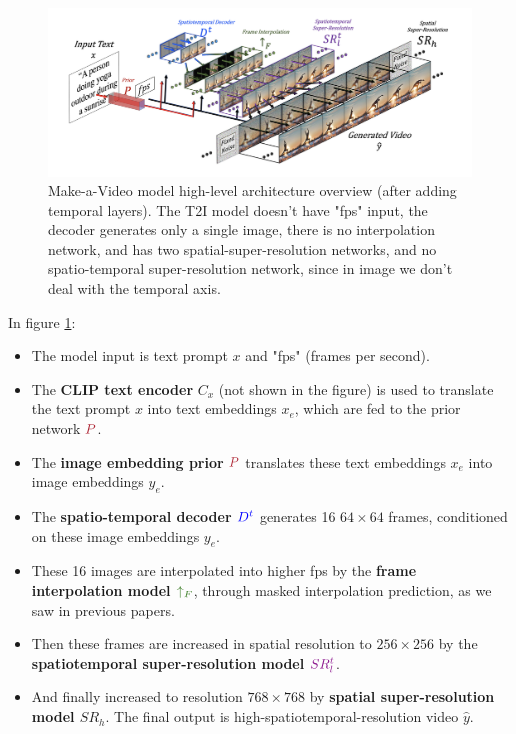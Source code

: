 \begin{figure}
    \centering
    \includegraphics[width=1\textwidth]{images/make_a_video/overview.png}
    \caption{Make-a-Video model high-level architecture overview (after adding temporal layers). The T2I model doesn't have "fps" input, the decoder generates only a single image, there is no interpolation network, and has two spatial-super-resolution networks, and no spatio-temporal super-resolution network, since in image we don't deal with the temporal axis.}
    \label{fig:make_a_video_overview}
\end{figure}

In figure \ref{fig:make_a_video_overview}:

\begin{itemize}
    \item The model input is text prompt $x$ and "fps" (frames per second).
    \item The \textbf{CLIP text encoder} $C_x$ (not shown in the figure) is used to translate the text prompt $x$ into text embeddings $x_e$, which are fed to the prior network $\textcolor{Maroon}{P}$.
    \item The \textbf{image embedding prior} $\textcolor{Maroon}{P}$ translates these text embeddings $x_e$ into image embeddings $y_e$.
    \item The \textbf{spatio-temporal decoder $\textcolor{blue}{D^t}$} generates 16 $64\times 64$ frames, conditioned on these image embeddings $y_e$.
    \item These 16 images are interpolated into higher fps by the \textbf{frame interpolation model $\textcolor{OliveGreen}{\uparrow_F}$}, through masked interpolation prediction, as we saw in previous papers.
    \item Then these frames are increased in spatial resolution to $256\times 256$ by the \textbf{spatiotemporal super-resolution model $\textcolor{Plum}{SR_l^t}$}.
    \item And finally increased to resolution $768\times 768$ by \textbf{spatial super-resolution model $SR_h$}. The final output is high-spatiotemporal-resolution video $\hat{y}$.
\end{itemize}

